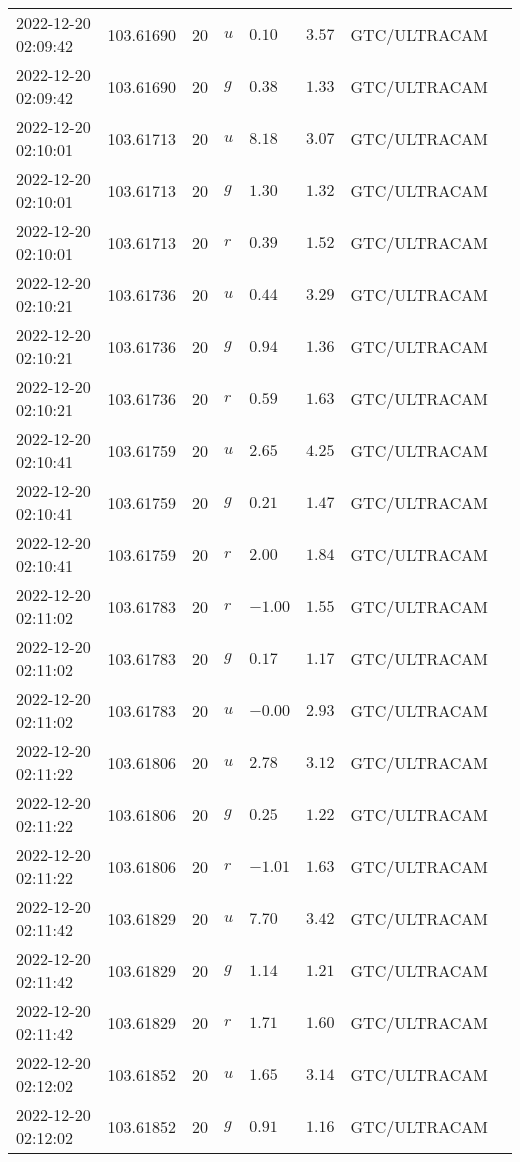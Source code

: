 \documentclass{nature_plusfigure}
\begin{document}
\begin{supplement}
\begin{center}
\begin{longtable}{llllllll}
2022-12-20 02:09:42 & 103.61690 & 20 & $u$ & $0.10$ & $3.57$ & GTC/ULTRACAM &  \\ 
2022-12-20 02:09:42 & 103.61690 & 20 & $g$ & $0.38$ & $1.33$ & GTC/ULTRACAM &  \\ 
2022-12-20 02:10:01 & 103.61713 & 20 & $u$ & $8.18$ & $3.07$ & GTC/ULTRACAM &  \\ 
2022-12-20 02:10:01 & 103.61713 & 20 & $g$ & $1.30$ & $1.32$ & GTC/ULTRACAM &  \\ 
2022-12-20 02:10:01 & 103.61713 & 20 & $r$ & $0.39$ & $1.52$ & GTC/ULTRACAM &  \\ 
2022-12-20 02:10:21 & 103.61736 & 20 & $u$ & $0.44$ & $3.29$ & GTC/ULTRACAM &  \\ 
2022-12-20 02:10:21 & 103.61736 & 20 & $g$ & $0.94$ & $1.36$ & GTC/ULTRACAM &  \\ 
2022-12-20 02:10:21 & 103.61736 & 20 & $r$ & $0.59$ & $1.63$ & GTC/ULTRACAM &  \\ 
2022-12-20 02:10:41 & 103.61759 & 20 & $u$ & $2.65$ & $4.25$ & GTC/ULTRACAM &  \\ 
2022-12-20 02:10:41 & 103.61759 & 20 & $g$ & $0.21$ & $1.47$ & GTC/ULTRACAM &  \\ 
2022-12-20 02:10:41 & 103.61759 & 20 & $r$ & $2.00$ & $1.84$ & GTC/ULTRACAM &  \\ 
2022-12-20 02:11:02 & 103.61783 & 20 & $r$ & $-1.00$ & $1.55$ & GTC/ULTRACAM &  \\ 
2022-12-20 02:11:02 & 103.61783 & 20 & $g$ & $0.17$ & $1.17$ & GTC/ULTRACAM &  \\ 
2022-12-20 02:11:02 & 103.61783 & 20 & $u$ & $-0.00$ & $2.93$ & GTC/ULTRACAM &  \\ 
2022-12-20 02:11:22 & 103.61806 & 20 & $u$ & $2.78$ & $3.12$ & GTC/ULTRACAM &  \\ 
2022-12-20 02:11:22 & 103.61806 & 20 & $g$ & $0.25$ & $1.22$ & GTC/ULTRACAM &  \\ 
2022-12-20 02:11:22 & 103.61806 & 20 & $r$ & $-1.01$ & $1.63$ & GTC/ULTRACAM &  \\ 
2022-12-20 02:11:42 & 103.61829 & 20 & $u$ & $7.70$ & $3.42$ & GTC/ULTRACAM &  \\ 
2022-12-20 02:11:42 & 103.61829 & 20 & $g$ & $1.14$ & $1.21$ & GTC/ULTRACAM &  \\ 
2022-12-20 02:11:42 & 103.61829 & 20 & $r$ & $1.71$ & $1.60$ & GTC/ULTRACAM &  \\ 
2022-12-20 02:12:02 & 103.61852 & 20 & $u$ & $1.65$ & $3.14$ & GTC/ULTRACAM &  \\ 
2022-12-20 02:12:02 & 103.61852 & 20 & $g$ & $0.91$ & $1.16$ & GTC/ULTRACAM &  \\ 

\end{longtable}
\end{center}
\end{supplement}
\end{document}
